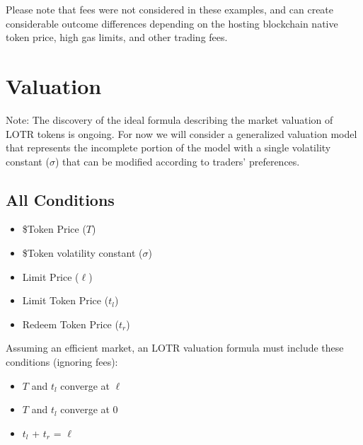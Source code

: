 \documentclass[12pt]{article}
\begin{document}
      Please note that fees were not considered in these examples, and can create considerable outcome differences depending on the hosting blockchain native token price, high gas limits, and other trading fees.

   \section{Valuation}
      Note: The discovery of the ideal formula describing the market valuation of LOTR tokens is ongoing. For now we will consider a generalized valuation model that represents the incomplete portion of the model with a single volatility constant ($\sigma$) that can be modified according to traders' preferences. \\

      \subsection{All Conditions}
         \begin{itemize}{}{}
            \item \$Token Price ($T$)
            \item \$Token volatility constant ($\sigma$)
            \item Limit Price ($\ell$)
            \item Limit Token Price ($t_{l}$)
            \item Redeem Token Price ($t_{r}$)
         \end{itemize}
         Assuming an efficient market, an LOTR valuation formula must include these conditions (ignoring fees):
         \begin{itemize}{}{}
            \item $T$ and $t_{l}$ converge at $\ell$
            \item $T$ and $t_{l}$ converge at 0
            \item $t_{l}$ + $t_{r}$ = $\ell$
         \end{itemize}
\end{document}
